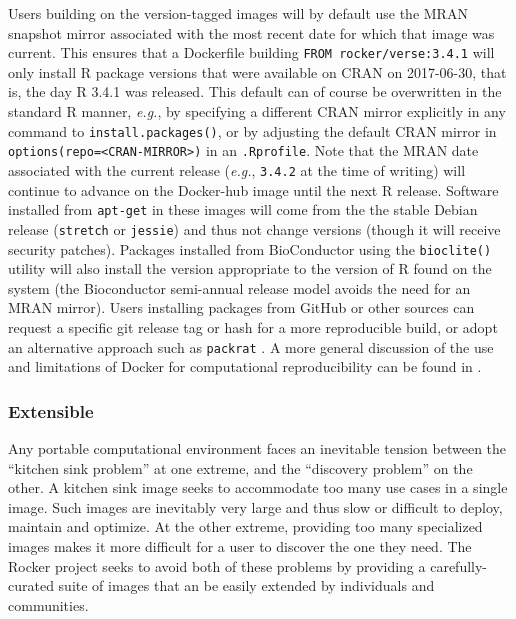 Users building on the version-tagged images will by default use the MRAN
snapshot mirror \citep{MRAN} associated with the most recent date for
which that image was current. This ensures that a Dockerfile building
\texttt{FROM\ rocker/verse:3.4.1} will only install R package versions
that were available on CRAN on 2017-06-30, that is, the day R 3.4.1 was
released. This default can of course be overwritten in the standard R
manner, \emph{e.g.}, by specifying a different CRAN mirror explicitly in
any command to \texttt{install.packages()}, or by adjusting the default
CRAN mirror in
\texttt{options(repo=\textless{}CRAN-MIRROR\textgreater{})} in an
\texttt{.Rprofile}. Note that the MRAN date associated with the current
release (\emph{e.g.}, \texttt{3.4.2} at the time of writing) will
continue to advance on the Docker-hub image until the next R release.
Software installed from \texttt{apt-get} in these images will come from
the the stable Debian release (\texttt{stretch} or \texttt{jessie}) and
thus not change versions (though it will receive security patches).
Packages installed from BioConductor using the \texttt{bioclite()}
utility will also install the version appropriate to the version of R
found on the system (the Bioconductor semi-annual release model avoids
the need for an MRAN mirror). Users installing packages from GitHub or
other sources can request a specific git release tag or hash for a more
reproducible build, or adopt an alternative approach such as
\texttt{packrat} \citep{packrat}. A more general discussion of the use
and limitations of Docker for computational reproducibility can be found
in \cite{Boettiger2015}.

\subsubsection{Extensible}\label{extensible}

Any portable computational environment faces an inevitable tension
between the ``kitchen sink problem'' at one extreme, and the ``discovery
problem'' on the other. A kitchen sink image seeks to accommodate too
many use cases in a single image. Such images are inevitably very large
and thus slow or difficult to deploy, maintain and optimize. At the
other extreme, providing too many specialized images makes it more
difficult for a user to discover the one they need. The Rocker project
seeks to avoid both of these problems by providing a carefully-curated
suite of images that an be easily extended by individuals and
communities.

